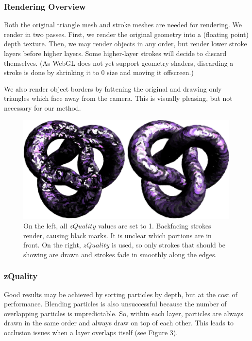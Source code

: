 \documentclass[conference]{acmsiggraph}
\begin{document}
\subsubsection{Rendering Overview}

Both the original triangle mesh and stroke meshes are needed for rendering. We
render in two passes. First, we render the original geometry into a (floating
point) depth texture. Then, we may render objects in any order, but render
lower stroke layers before higher layers. Some higher-layer strokes will decide
to discard themselves. (As WebGL does not yet support geometry shaders,
discarding a stroke is done by shrinking it to 0 size and moving it offscreen.)

We also render object borders by fattening the original and drawing only
triangles which face away from the camera. This is visually pleasing, but not
necessary for our method.

\begin{figure}[t] %
  \centering
  \includegraphics[width=4.5in]{images/torus_depth_test_demo}
  \caption{On the left, all $zQuality$ values are set to 1. Backfacing strokes
           render, causing black marks. It is unclear which portions are in
           front. On the right, $zQuality$ is used, so only strokes that should
           be showing are drawn and strokes fade in smoothly along the edges.}
\end{figure}

\subsubsection{zQuality}

Good results may be achieved by sorting particles by depth, but at the cost of
performance. Blending particles is also unsuccessful because the number of
overlapping particles is unpredictable. So, within each layer, particles are
always drawn in the same order and always draw on top of each other. This leads
to occlusion issues when a layer overlaps itself (see Figure 3).
\end{document}
